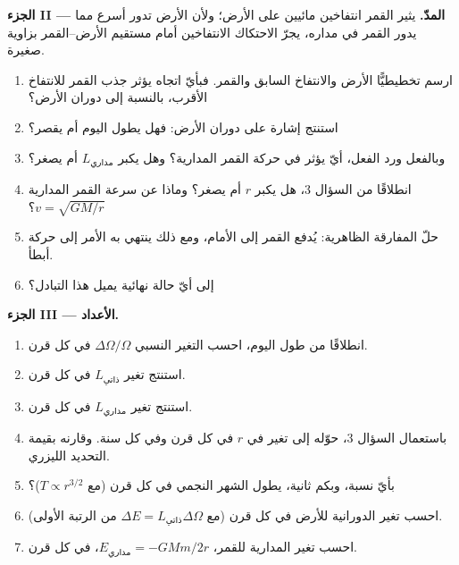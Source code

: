 \begin{problem}
\medskip
\noindent\textbf{الجزء II ---  المدّ.}
يثير القمر انتفاخين مائيين على الأرض؛ ولأن الأرض
تدور أسرع مما يدور القمر في مداره، يجرّ الاحتكاك الانتفاخين أمام
مستقيم الأرض--القمر بزاوية صغيرة.
\begin{enumerate}[resume]
  \item ارسم تخطيطيًّا الأرض والانتفاخ السابق والقمر. فبأيّ
        اتجاه يؤثر جذب القمر للانتفاخ الأقرب،
        بالنسبة إلى دوران الأرض؟
  \item استنتج إشارة  على دوران الأرض: فهل يطول
        اليوم أم يقصر؟
  \item وبالفعل ورد الفعل، أيّ  يؤثر في حركة القمر
        المدارية؟ وهل يكبر $L_{\text{مداري}}$ أم يصغر؟
  \item انطلاقًا من السؤال 3، هل يكبر $r$ أم يصغر؟ وماذا عن سرعة
        القمر المدارية $v = \sqrt{GM/r}$؟
  \item حلّ المفارقة الظاهرية: يُدفع القمر إلى الأمام، ومع ذلك
        ينتهي به الأمر إلى حركة أبطأ.
  \item إلى أيّ حالة نهائية يميل هذا التبادل؟
\end{enumerate}

\medskip
\noindent\textbf{الجزء III --- الأعداد.}
\begin{enumerate}[resume]
  \item انطلاقًا من طول اليوم، احسب التغير النسبي
        $\Delta\Omega/\Omega$ في كل قرن.
  \item استنتج تغير $L_{\text{ذاتي}}$ في كل قرن.
  \item استنتج تغير $L_{\text{مداري}}$ في كل قرن.
  \item باستعمال السؤال 3، حوّله إلى تغير في $r$ في كل قرن
        وفي كل سنة. وقارنه بقيمة التحديد الليزري.
  \item بأيّ نسبة، وبكم ثانية، يطول الشهر النجمي
        في كل قرن (مع $T \propto r^{3/2}$)؟
  \item احسب تغير  الدورانية للأرض
        في كل قرن (مع $\Delta E = L_{\text{ذاتي}}\Delta\Omega$ من الرتبة
        الأولى).
  \item احسب تغير  المدارية للقمر،
        $E_{\text{مداري}} = -GMm/2r$، في كل قرن.
\end{enumerate}


\end{problem}
